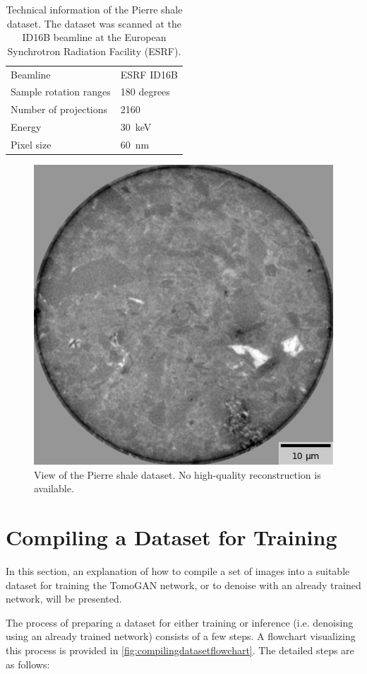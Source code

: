 \begin{table}[htbp]
    \centering
    \caption[Technical information of the Pierre shale dataset]{Technical information of the Pierre shale dataset. The dataset was scanned at the ID16B beamline at the European Synchrotron Radiation Facility (ESRF). }
    \label{tab:pierreshale}
    \begin{tabular}{ll}
    \hline
    Beamline & ESRF ID16B \\
    Sample rotation ranges &  180 degrees\\
    Number of projections &  2160 \\
    Energy & \SI{30}{\kilo \electronvolt} \\
    Pixel size & \SI{60}{\nano \meter} \\
    \hline
    \end{tabular}
\end{table}

\begin{figure}[htbp]
    \centering
    \includegraphics[width=.45\textwidth]{figures/shalens.png}
    \caption[Pierre shale dataset]{View of the Pierre shale dataset. No high-quality reconstruction is available. }
    \label{fig:shaledataset}
  \end{figure}


\section{Compiling a Dataset for Training}
\label{sec:method:compilingdataset}
In this section, an explanation of how to compile a set of images into a suitable dataset for training the TomoGAN network, or to denoise with an already trained network, will be presented. 

The process of preparing a dataset for either training or inference (i.e. denoising using an already trained network) consists of a few steps. A flowchart visualizing this process is provided in \cref{fig:compilingdatasetflowchart}. The detailed steps are as follows:

